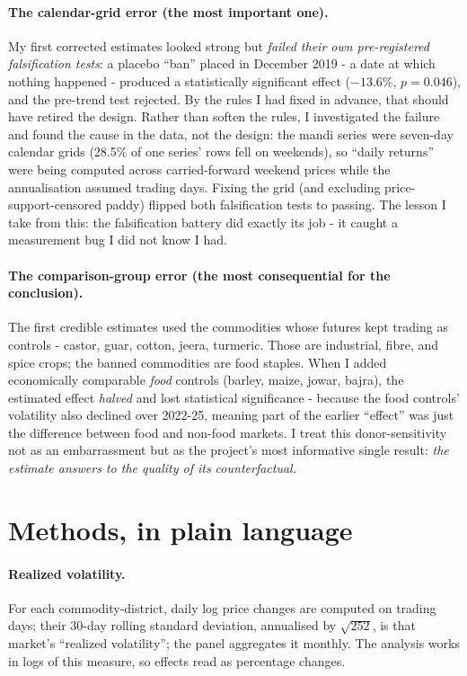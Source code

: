 \documentclass[11pt]{article}
\begin{document}
\paragraph{The calendar-grid error (the most important one).} My first corrected estimates
looked strong but \emph{failed their own pre-registered falsification tests}: a placebo
``ban'' placed in December 2019 - a date at which nothing happened - produced a
statistically significant effect ($-13.6\%$, $p=0.046$), and the pre-trend test rejected.
By the rules I had fixed in advance, that should have retired the design. Rather than
soften the rules, I investigated the failure and found the cause in the data, not the
design: the mandi series were seven-day calendar grids (28.5\% of one series' rows fell on
weekends), so ``daily returns'' were being computed across carried-forward weekend prices
while the annualisation assumed trading days. Fixing the grid (and excluding
price-support-censored paddy) flipped both falsification tests to passing. The lesson I
take from this: the falsification battery did exactly its job - it caught a measurement
bug I did not know I had.

\paragraph{The comparison-group error (the most consequential for the conclusion).} The
first credible estimates used the commodities whose futures kept trading as controls -
castor, guar, cotton, jeera, turmeric. Those are industrial, fibre, and spice crops; the
banned commodities are food staples. When I added economically comparable \emph{food}
controls (barley, maize, jowar, bajra), the estimated effect \emph{halved} and lost
statistical significance - because the food controls' volatility also declined over
2022-25, meaning part of the earlier ``effect'' was just the difference between food and
non-food markets. I treat this donor-sensitivity not as an embarrassment but as the
project's most informative single result: \emph{the estimate answers to the quality of its
counterfactual.}

\section{Methods, in plain language}
\label{sec:methods}

\paragraph{Realized volatility.} For each commodity-district, daily log price changes are
computed on trading days; their 30-day rolling standard deviation, annualised by
$\sqrt{252}$, is that market's ``realized volatility''; the panel aggregates it monthly.
The analysis works in logs of this measure, so effects read as percentage changes.
\end{document}
